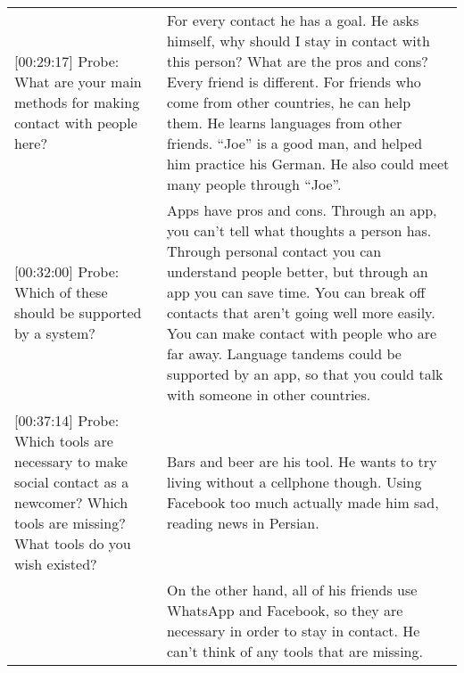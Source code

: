 \begin{longtable}{p{}p{}}
{[}00:29:17{]} Probe: What are your main methods for making contact with people here?                                                                           & For every contact he has a goal. He asks himself, why should I stay in contact with this person? What are the pros and cons? Every friend is different. For friends who come from other countries, he can help them. He learns languages from other friends. ``Joe'' is a good man, and helped him practice his German. He also could meet many people through ``Joe''.                                                                                                                                                                                                                             \\
{[}00:32:00{]} Probe: Which of these should be supported by a system?                                                                                           & Apps have pros and cons. Through an app, you can't tell what thoughts a person has. Through personal contact you can understand people better, but through an app you can save time. You can break off contacts that aren't going well more easily. You can make contact with people who are far away. Language tandems could be supported by an app, so that you could talk with someone in other countries.                                                                                                                                                                                   \\
{[}00:37:14{]} Probe: Which tools are necessary to make social contact as a newcomer? Which tools are missing? What tools do you wish existed?                  & Bars and beer are his tool. He wants to try living without a cellphone though. Using Facebook too much actually made him sad, reading news in Persian.                                                                                                                                                                                                                                                                                                                                                                                                                                          \\
                                                                                                                                                                & On the other hand, all of his friends use WhatsApp and Facebook, so they are necessary in order to stay in contact. He can't think of any tools that are missing.                                                                                                                                                                                                                                                                                                                                                                                                                               \\

\end{longtable}
